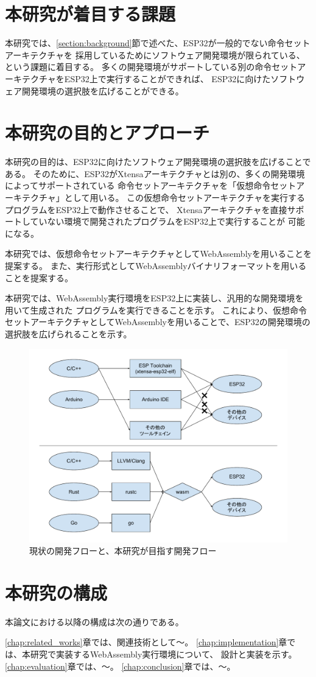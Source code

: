 \section{本研究が着目する課題}

本研究では、\ref{section:background}節で述べた、ESP32が一般的でない命令セットアーキテクチャを
採用しているためにソフトウェア開発環境が限られている、という課題に着目する。
多くの開発環境がサポートしている別の命令セットアーキテクチャをESP32上で実行することができれば、
ESP32に向けたソフトウェア開発環境の選択肢を広げることができる。

\section{本研究の目的とアプローチ}

本研究の目的は、ESP32に向けたソフトウェア開発環境の選択肢を広げることである。
そのために、ESP32がXtensaアーキテクチャとは別の、多くの開発環境によってサポートされている
命令セットアーキテクチャを「仮想命令セットアーキテクチャ」として用いる。
この仮想命令セットアーキテクチャを実行するプログラムをESP32上で動作させることで、
Xtensaアーキテクチャを直接サポートしていない環境で開発されたプログラムをESP32上で実行することが
可能になる。

本研究では、仮想命令セットアーキテクチャとしてWebAssemblyを用いることを提案する。
また、実行形式としてWebAssemblyバイナリフォーマットを用いることを提案する。

本研究では、WebAssembly実行環境をESP32上に実装し、汎用的な開発環境を用いて生成された
プログラムを実行できることを示す。
これにより、仮想命令セットアーキテクチャとしてWebAssemblyを用いることで、ESP32の開発環境の
選択肢を広げられることを示す。

\begin{figure}[htbp]
  \caption{現状の開発フローと、本研究が目指す開発フロー}
  \label{fig:new_world}
  \begin{center}
    \includegraphics[bb=0 0 800 600,width=12cm]{img/new_world.pdf}
  \end{center}
\end{figure}

\section{本研究の構成}

本論文における以降の構成は次の通りである。

\ref{chap:related_works}章では、関連技術として〜。
\ref{chap:implementation}章では、本研究で実装するWebAssembly実行環境について、
設計と実装を示す。
\ref{chap:evaluation}章では、〜。
\ref{chap:conclusion}章では、〜。
